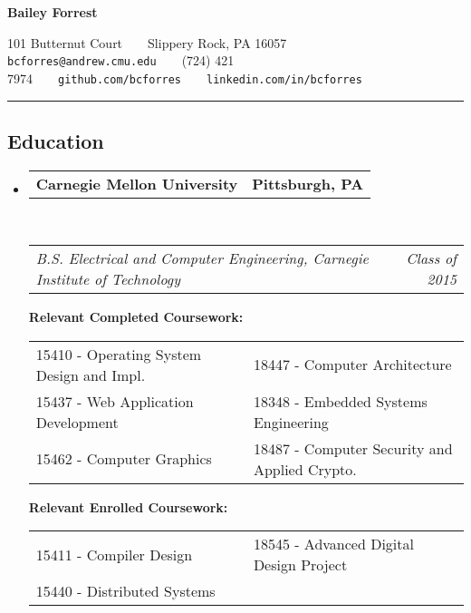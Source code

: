 \documentclass[10pt, letterpaper]{article}
\makeatletter
\newcommand{\titleTopOffset}{-1.0em} %
\newcommand{\titleBotOffset}{-0.4em} %
\newcommand{\headerrow}[2]
{\begin{tabular*}{\linewidth}{l@{\extracolsep{\fill}}r}
    #1 & #2 \\
\end{tabular*}}
\newcommand{\sectionheader}[1]
{\hrule
\vspace{\titleTopOffset}
\subsection*{#1}
\vspace{\titleBotOffset}}
\makeatother
\begin{document}
\begin{center}
{\LARGE \textbf{Bailey Forrest}}

101 Butternut Court\ \ \textbullet \ \ Slippery Rock, PA 16057 \\
\texttt{bcforres@andrew.cmu.edu}\ \ \textbullet \ \ (724) 421 7974\ \ \textbullet \ \ \texttt{github.com/bcforres}\ \ \textbullet \ \ \texttt{linkedin.com/in/bcforres}
\end{center}

\sectionheader{Education}
\begin{itemize}
    \item
        \headerrow
            {\textbf{Carnegie Mellon University}}
            {\textbf{Pittsburgh, PA}}
        \\
        \headerrow
            {\emph{B.S. Electrical and Computer Engineering, Carnegie Institute of Technology}}
            {\emph{Class of 2015}}


        \smallskip
        \textbf{Relevant Completed Coursework:}

        \begin{tabular*}{\linewidth}{p{0.5\linewidth}  p{0.5\linewidth}}
            15410 - Operating System Design and Impl. & 18447 - Computer Architecture \\
            15437 - Web Application Development & 18348 - Embedded Systems Engineering \\
            15462 - Computer Graphics & 18487 - Computer Security and Applied Crypto. \\
        \end{tabular*}


        \smallskip
        \textbf{Relevant Enrolled Coursework:}

        \begin{tabular*}{\linewidth}{p{0.5\linewidth}  p{0.5\linewidth}}
            15411 - Compiler Design & 18545 - Advanced Digital Design Project \\
            15440 - Distributed Systems & \\
        \end{tabular*}

\end{itemize}
\end{document}
